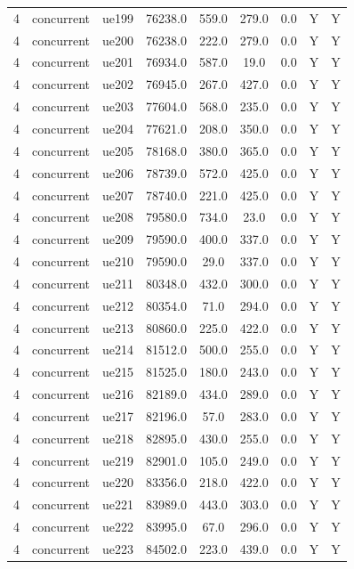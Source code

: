 \begin{table}[ht]
\begin{tabular}{|c|c|c|c|c|c|c|c|c|}
4 & concurrent & ue199 & 76238.0 & 559.0 & 279.0 & 0.0 & Y & Y \\
4 & concurrent & ue200 & 76238.0 & 222.0 & 279.0 & 0.0 & Y & Y \\
4 & concurrent & ue201 & 76934.0 & 587.0 & 19.0 & 0.0 & Y & Y \\
4 & concurrent & ue202 & 76945.0 & 267.0 & 427.0 & 0.0 & Y & Y \\
4 & concurrent & ue203 & 77604.0 & 568.0 & 235.0 & 0.0 & Y & Y \\
4 & concurrent & ue204 & 77621.0 & 208.0 & 350.0 & 0.0 & Y & Y \\
4 & concurrent & ue205 & 78168.0 & 380.0 & 365.0 & 0.0 & Y & Y \\
4 & concurrent & ue206 & 78739.0 & 572.0 & 425.0 & 0.0 & Y & Y \\
4 & concurrent & ue207 & 78740.0 & 221.0 & 425.0 & 0.0 & Y & Y \\
4 & concurrent & ue208 & 79580.0 & 734.0 & 23.0 & 0.0 & Y & Y \\
4 & concurrent & ue209 & 79590.0 & 400.0 & 337.0 & 0.0 & Y & Y \\
4 & concurrent & ue210 & 79590.0 & 29.0 & 337.0 & 0.0 & Y & Y \\
4 & concurrent & ue211 & 80348.0 & 432.0 & 300.0 & 0.0 & Y & Y \\
4 & concurrent & ue212 & 80354.0 & 71.0 & 294.0 & 0.0 & Y & Y \\
4 & concurrent & ue213 & 80860.0 & 225.0 & 422.0 & 0.0 & Y & Y \\
4 & concurrent & ue214 & 81512.0 & 500.0 & 255.0 & 0.0 & Y & Y \\
4 & concurrent & ue215 & 81525.0 & 180.0 & 243.0 & 0.0 & Y & Y \\
4 & concurrent & ue216 & 82189.0 & 434.0 & 289.0 & 0.0 & Y & Y \\
4 & concurrent & ue217 & 82196.0 & 57.0 & 283.0 & 0.0 & Y & Y \\
4 & concurrent & ue218 & 82895.0 & 430.0 & 255.0 & 0.0 & Y & Y \\
4 & concurrent & ue219 & 82901.0 & 105.0 & 249.0 & 0.0 & Y & Y \\
4 & concurrent & ue220 & 83356.0 & 218.0 & 422.0 & 0.0 & Y & Y \\
4 & concurrent & ue221 & 83989.0 & 443.0 & 303.0 & 0.0 & Y & Y \\
4 & concurrent & ue222 & 83995.0 & 67.0 & 296.0 & 0.0 & Y & Y \\
4 & concurrent & ue223 & 84502.0 & 223.0 & 439.0 & 0.0 & Y & Y \\

\end{tabular}
\end{table}
